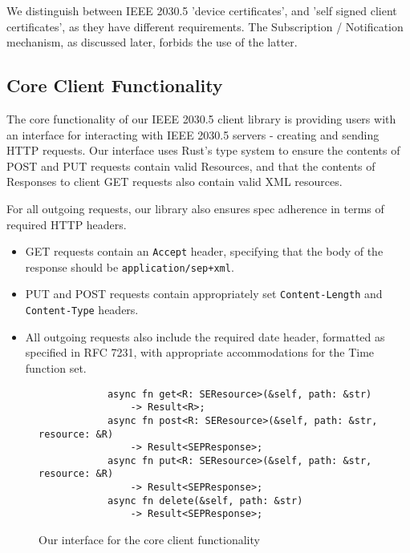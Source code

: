We distinguish between IEEE 2030.5 'device certificates', and 'self signed client certificates', as they have different requirements. The Subscription / Notification mechanism, as discussed later, forbids the use of the latter.

\subsection{Core Client Functionality}
The core functionality of our IEEE 2030.5 client library is providing users with an interface for interacting with IEEE 2030.5 servers - creating and sending HTTP requests.
Our interface uses Rust's type system to ensure the contents of POST and PUT requests contain valid Resources, and that the contents of Responses to client GET requests also contain valid XML resources.

For all outgoing requests, our library also ensures spec adherence in terms of required HTTP headers. 

\begin{itemize}
    \item GET requests contain an \texttt{Accept} header, specifying that the body of the response should be \texttt{application/sep+xml}.
    \item PUT and POST requests contain appropriately set \texttt{Content-Length} and \texttt{Content-Type} headers.
    \item All outgoing requests also include the required date header, formatted as specified in RFC 7231, with appropriate accommodations for the Time function set. \cite{rfc7231}
\end{itemize}


\begin{figure}[h]
    \begin{center}
        \begin{lstlisting}
            async fn get<R: SEResource>(&self, path: &str) 
                -> Result<R>;
            async fn post<R: SEResource>(&self, path: &str, resource: &R) 
                -> Result<SEPResponse>;
            async fn put<R: SEResource>(&self, path: &str, resource: &R) 
                -> Result<SEPResponse>;
            async fn delete(&self, path: &str) 
                -> Result<SEPResponse>;
        \end{lstlisting}
        \label{fig:clientrequestinterface}
        \vspace{-10pt}
        \caption{Our interface for the core client functionality}
    \end{center}
\end{figure}

